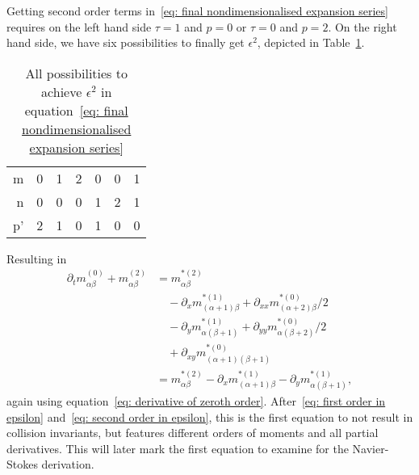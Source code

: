 Getting second order terms in~\eqref{eq: final nondimensionalised expansion series} requires on the left hand side $\tau=1$ and $p=0$ or $\tau=0$ and $p=2$.
On the right hand side, we have six possibilities to finally get $\epsilon^2$, depicted in Table~\ref{table: second order epsilon}.
\begin{table}[h]
  \centering
  \begin{tabular} {r || c | *{2}{c} | *{2}{c} | c}
    m  & 0 & 1 & 2 & 0 & 0 & 1 \\
    n  & 0 & 0 & 0 & 1 & 2 & 1 \\
    p' & 2 & 1 & 0 & 1 & 0 & 0
  \end{tabular}
  \caption{All possibilities to achieve $\epsilon^2$ in equation~\eqref{eq: final nondimensionalised expansion series}}
\label{table: second order epsilon}
\end{table}
Resulting in
\begin{equation}
  \label{eq: second order in epsilon}
  \begin{aligned}
    \partial_t m_{\alpha\beta}^{(0)} + m_{\alpha\beta}^{(2)}
    & =  m_{\alpha\beta}^{*(2)} \\
    &\quad - \partial_x m_{(\alpha+1)\beta}^{*(1)} + \partial_{xx} m_{(\alpha+2)\beta}^{*(0)}/2 \\
    &\quad - \partial_y m_{\alpha(\beta+1)}^{*(1)} + \partial_{yy} m_{\alpha(\beta+2)}^{*(0)}/2 \\
    &\quad + \partial_{xy} m_{(\alpha+1)(\beta+1)}^{*(0)}\\
    & =  m_{\alpha\beta}^{*(2)} - \partial_x m_{(\alpha+1)\beta}^{*(1)} - \partial_y m_{\alpha(\beta+1)}^{*(1)},
  \end{aligned}
\end{equation}
again using equation~\eqref{eq: derivative of zeroth order}.
After~\eqref{eq: first order in epsilon} and~\eqref{eq: second order in epsilon}, this is the first equation to not result in collision invariants, but features different orders of moments and all partial derivatives.
This will later mark the first equation to examine for the Navier-Stokes derivation.

